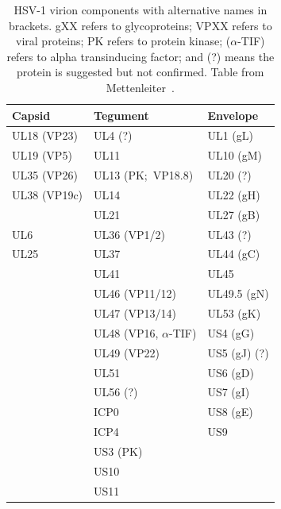 \begin{table}
    \centering
    \caption[\gls{HSV}-1 virion components]{
    \gls{HSV}-1 virion components with alternative names in brackets.
    gXX refers to glycoproteins;
    VPXX refers to viral proteins;
    PK refers to protein kinase;
    (\(\alpha \)-TIF) refers to alpha transinducing factor;
    and (?) means the protein is suggested but not confirmed.
    Table from Mettenleiter~\cite{mettenleiterHerpesvirusAssemblyEgress2002}.
    }\label{tab:virus_proteins}
\begin{tabular}{lll}
    \toprule
Capsid       & Tegument           & Envelope     \\
\midrule
UL18 (VP23)  & UL4 (?)            & UL1 (gL)     \\
UL19 (VP5)   & UL11               & UL10 (gM)    \\
UL35 (VP26)  & UL13 (PK;~VP18.8)  & UL20 (?)     \\
UL38 (VP19c) & UL14               & UL22 (gH)    \\
             & UL21               & UL27 (gB)    \\
UL6          & UL36 (VP1/2)       & UL43 (?)     \\
UL25         & UL37               & UL44 (gC)    \\
             & UL41          & UL45         \\
             & UL46 (VP11/12)     & UL49.5 (gN)  \\
             & UL47 (VP13/14)     & UL53 (gK)    \\
             & UL48 (VP16, \(\alpha \)-TIF) & US4 (gG)     \\
             & UL49 (VP22)        & US5 (gJ) (?) \\
             & UL51               & US6 (gD)     \\
             & UL56 (?)           & US7 (gI)     \\
             & ICP0               & US8 (gE)     \\
             & ICP4               & US9          \\
             & US3 (PK)           &              \\
             & US10               &              \\
             & US11               &         \\
             \bottomrule
\end{tabular}
\end{table}

